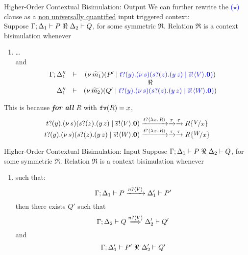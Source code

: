 \documentclass{beamer}
\newcommand{\prcolor}[1]{{\color{blue} #1}}
\begin{document}
	\begin{frame}{Higher-Order Contextual Bisimulation: Output}
		We can further rewrite the \textcolor{blue}{($\star$)} clause as a \underline{non universally quantified} input triggered context:
		\\[2mm]

		Suppose $\Gamma; \Delta_1 \proves P\ \Re\ \Delta_2 \proves Q$, for some symmetric $\Re$. Relation $\Re$ is
		a context bisimulation whenever
		\begin{enumerate}[$(\star)$]
			\item
				\dots\\
				and
				\[
					\begin{array}{rcc}
						\Gamma; \Delta_1'' &\proves& \newsp{\widetilde{m_1}}{P' \Par \prcolor{\binp{t}{y}\newsp{s}{\binp{s}{z} (\appl{y}{z}) \Par \bout{\dual{s}}{V} \inact}}}
						\\
						&& \Re
						\\
						\Delta_1'' &\proves& \newsp{\widetilde{m_2}}{Q' \Par \prcolor{\binp{t}{y}\newsp{s}{\binp{s}{z} (\appl{y}{z}) \Par \bout{\dual{s}}{W} \inact}}}
					\end{array}
				\]
		\end{enumerate}

		This is because \emph{\textbf{for all} $R$} with $\mathtt{fv}(R)=x$, 
		\[
			\begin{array}{c}
				\binp{t}{y}\newsp{s}{\binp{s}{z} (\appl{y}{z}) \Par \bout{\dual{s}}{V} \inact}
				\by{\bactinp{t}{\abs{x}{R}}} \by{\tau} \by{\tau}
				R \subst{V}{x}
				\\
				\binp{t}{y}\newsp{s}{\binp{s}{z} (\appl{y}{z}) \Par \bout{\dual{s}}{W} \inact}
				\by{\bactinp{t}{\abs{x}{R}}} \by{\tau} \by{\tau}
				R \subst{W}{x}
			\end{array}
		\]
	\end{frame}

	\begin{frame}{Higher-Order Contextual Bisimulation: Input}
		Suppose $\Gamma; \Delta_1 \proves P\ \Re\ \Delta_2 \proves Q$, for some symmetric $\Re$. Relation $\Re$ is
		a context bisimulation whenever
		\begin{enumerate}[$(\bullet)$]
			\item	{} such that:
				\[
					\Gamma; \Delta_1 \vdash P \xrightarrow{n ? \langle V \rangle} \Delta_1' \vdash P'
				\]
				then there exists $Q'$ such that
				\[
					\Gamma; \Delta_2 \vdash Q \stackrel{n ? \langle V \rangle}{\Longrightarrow} \Delta_2' \vdash Q'
				\]
				and
				\[
					\Gamma; \Delta_1' \vdash P'\ \Re\ \Delta_2' \vdash Q'
				\]
		\end{enumerate}
	\end{frame}
\end{document}
